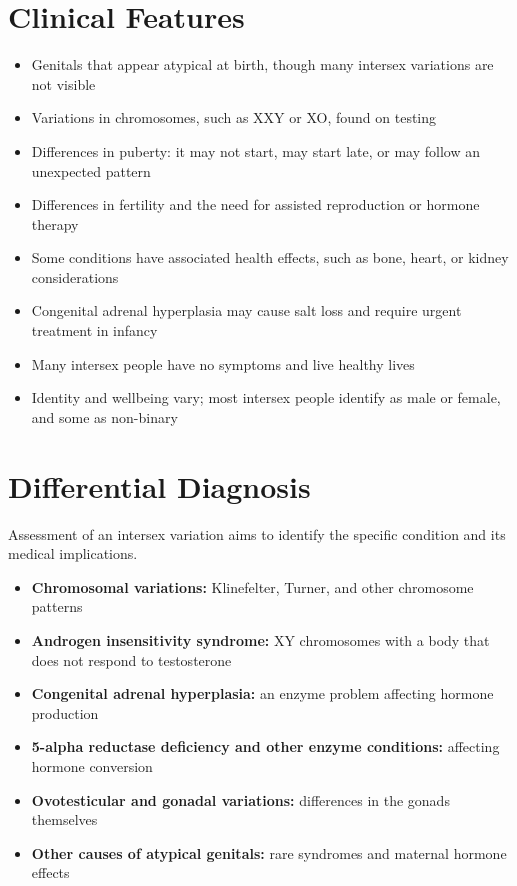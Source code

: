 \section*{Clinical Features}
\begin{itemize}
    \item Genitals that appear atypical at birth, though many intersex variations are not visible
    \item Variations in chromosomes, such as XXY or XO, found on testing
    \item Differences in puberty: it may not start, may start late, or may follow an unexpected pattern
    \item Differences in fertility and the need for assisted reproduction or hormone therapy
    \item Some conditions have associated health effects, such as bone, heart, or kidney considerations
    \item Congenital adrenal hyperplasia may cause salt loss and require urgent treatment in infancy
    \item Many intersex people have no symptoms and live healthy lives
    \item Identity and wellbeing vary; most intersex people identify as male or female, and some as non-binary
\end{itemize}

\section*{Differential Diagnosis}
Assessment of an intersex variation aims to identify the specific condition and its medical implications.
\begin{itemize}
    \item \textbf{Chromosomal variations:} Klinefelter, Turner, and other chromosome patterns
    \item \textbf{Androgen insensitivity syndrome:} XY chromosomes with a body that does not respond to testosterone
    \item \textbf{Congenital adrenal hyperplasia:} an enzyme problem affecting hormone production
    \item \textbf{5-alpha reductase deficiency and other enzyme conditions:} affecting hormone conversion
    \item \textbf{Ovotesticular and gonadal variations:} differences in the gonads themselves
    \item \textbf{Other causes of atypical genitals:} rare syndromes and maternal hormone effects
\end{itemize}

